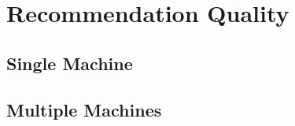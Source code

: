 \section{Recommendation Quality}
\subsection{Single Machine}
\label{Riado_Lyaer_RL}


\subsection{Multiple Machines}
\label{Riado_Lyaer_RL}
